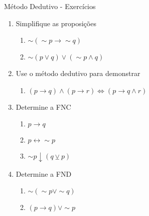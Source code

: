 \begin{frame}[t]{Método Dedutivo - Exercícios}
	\begin{enumerate}
	\item Simplifique as proposições
	\begin{enumerate}
	\item $\sim(\sim p \rightarrow \sim q)$
	\item $\sim(p \vee q) \vee (\sim p \wedge q)$
	\end{enumerate}
	
	\item Use o método dedutivo para demonstrar
	\begin{enumerate}
	\item $(p \rightarrow q) \wedge (p \rightarrow r) \Leftrightarrow (p \rightarrow q \wedge r)$
	\end{enumerate}
	
	\item Determine a FNC
	\begin{enumerate}
	\item $p \rightarrow q$
	\item $p \leftrightarrow\sim p$
	\item $\sim p \downarrow (q \veebar p)$
	\end{enumerate}
	
	\item Determine a FND
	\begin{enumerate}
	\item $\sim(\sim p \vee\sim q)$
	\item $(p \rightarrow q) \vee \sim p$
	\end{enumerate}
	\end{enumerate}

\end{frame}

